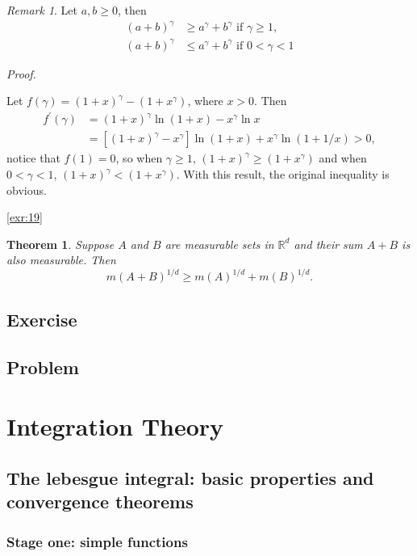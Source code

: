 \documentclass[
]{book}
\newtheorem{theorem}{Theorem}[chapter]
\theoremstyle{definition}
\theoremstyle{definition}
\theoremstyle{definition}
\theoremstyle{definition}
\theoremstyle{remark}
\newtheorem*{remark}{Remark}
\begin{document}
\begin{remark}
\leavevmode

Let \(a,b\ge0\), then
\[
\begin{aligned}
(a+b)^\gamma&\ge a^\gamma+b^\gamma\text{ if }\gamma\ge 1,\\
(a+b)^\gamma&\le a^\gamma+b^\gamma\text{ if }0<\gamma< 1
\end{aligned}
\]

\emph{Proof.}

Let \(f(\gamma)=(1+x)^\gamma-(1+x^\gamma)\), where \(x> 0\). Then
\[
\begin{aligned}
f^\prime (\gamma)&=(1+x)^\gamma\ln(1+x)-x^\gamma\ln x\\
&=[(1+x)^\gamma-x^\gamma]\ln(1+x)+x^\gamma\ln(1+1/x)>0,
\end{aligned}
\]
notice that \(f(1)=0\), so when \(\gamma\ge 1\), \((1+x)^\gamma\ge(1+x^\gamma)\) and when \(0<\gamma< 1\), \((1+x)^\gamma<(1+x^\gamma)\). With this result, the original inequality is obvious.

\end{remark}

\ref{exr:19}

\begin{theorem}
Suppose \(A\) and \(B\) are measurable sets in \(\mathbb{R}^d\) and their sum \(A+B\) is also measurable. Then
\[
m(A+B)^{1/d}\ge m(A)^{1/d}+m(B)^{1/d}.
\]
\end{theorem}

\section{Exercise}\label{exercise}

\section{Problem}\label{problem}

\chapter{Integration Theory}\label{ch2}

\section{The lebesgue integral: basic properties and convergence theorems}\label{the-lebesgue-integral-basic-properties-and-convergence-theorems}

\subsection{Stage one: simple functions}\label{stage-one-simple-functions}
\end{document}
